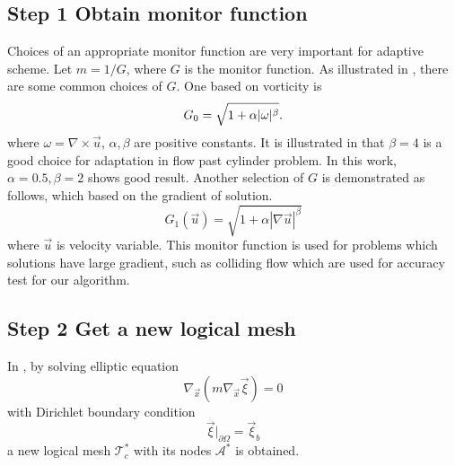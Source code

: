 \documentclass[a4paper, 11pt]{article}
\begin{document}
   \subsection{Step 1 Obtain monitor function}
      Choices of an appropriate monitor function are very important for
      adaptive scheme. Let $m = 1/G$, where $G$ is the monitor
      function. As illustrated in \cite{di2005moving}, there are some
      common choices of $G$. One based on vorticity is 
      \begin{equation}
        \centering
        G_0 = \sqrt{1 + \alpha |\omega|^\beta}.
        \label{eq::monitor_vorticity}
      \end{equation}
      where $\omega = \nabla \times \vec{u}$, $\alpha, \beta$
      are positive constants. It is illustrated in \cite{cao1999anr}
      that $\beta = 4$ is a good choice for adaptation in flow past
      cylinder problem. In this work, $\alpha = 0.5, \beta = 2$ shows
      good result. Another selection of $G$ is demonstrated as
      follows, which based on the gradient of solution.
      \begin{equation}
        G_1(\vec{u}) = \sqrt{1 + \alpha |\nabla \vec{u}|^\beta}
        \label{eq::monitor_gradient}
      \end{equation}
      where $\vec{u}$ is velocity variable. This monitor function is
      used for problems which solutions have large gradient, such as
      colliding flow which are used for accuracy test for our
      algorithm.
   \subsection{Step 2 Get a new logical mesh}
      In \cite{li2001mesh}, by solving elliptic equation 
      \begin{equation}
        \nabla_{\vec{x}}(m \nabla_{\vec{x}} \vec{\xi}) = 0
        \label{eq::logical}
      \end{equation}
      with Dirichlet boundary condition 
      \begin{equation}
        \vec{\xi}|_{\partial \Omega} = \vec{\xi}_b
        \label{eq::EL_boundary}
      \end{equation}
      a new logical mesh $\mathcal{T}_c^*$ with its nodes
      $\mathcal{A}^*$ is obtained.
\end{document}

